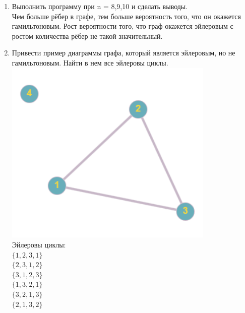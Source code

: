 \documentclass[a4paper,14pt]{extarticle}
\begin{document}
\begin{enumerate}[1.]
    \item Выполнить программу при n = 8,9,10 и сделать выводы.\\
          Чем больше рёбер в графе, тем больше вероятность того, что он окажется
          гамильтоновым.
          Рост вероятности того, что граф окажется эйлеровым с ростом количества рёбер не такой значительный.
    \item Привести пример диаграммы графа, который является эйлеровым,
          но не гамильтоновым. Найти в нем все эйлеровы циклы.\\
          \includegraphics[width=100mm]{4}\\
          Эйлеровы циклы:\\
          $\{1, 2, 3, 1\}$\\
          $\{2, 3, 1, 2\}$\\
          $\{3, 1, 2, 3\}$\\
          $\{1, 3, 2, 1\}$\\
          $\{3, 2, 1, 3\}$\\
          $\{2, 1, 3, 2\}$


\end{enumerate}
\end{document}
